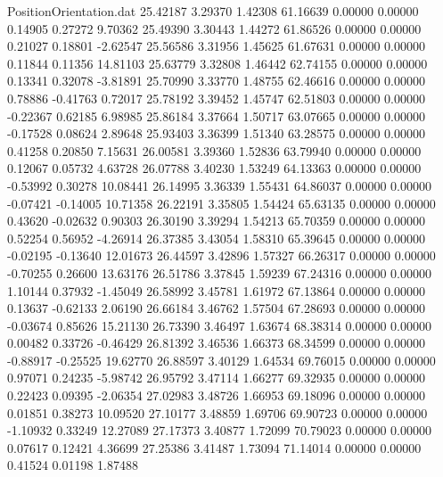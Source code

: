 \begin{filecontents}{PositionOrientation.dat}
  25.42187    3.29370    1.42308    61.16639    0.00000    0.00000    0.14905    0.27272    9.70362
  25.49390    3.30443    1.44272    61.86526    0.00000    0.00000    0.21027    0.18801   -2.62547
  25.56586    3.31956    1.45625    61.67631    0.00000    0.00000    0.11844    0.11356   14.81103
  25.63779    3.32808    1.46442    62.74155    0.00000    0.00000    0.13341    0.32078   -3.81891
  25.70990    3.33770    1.48755    62.46616    0.00000    0.00000    0.78886   -0.41763    0.72017
  25.78192    3.39452    1.45747    62.51803    0.00000    0.00000   -0.22367    0.62185    6.98985
  25.86184    3.37664    1.50717    63.07665    0.00000    0.00000   -0.17528    0.08624    2.89648
  25.93403    3.36399    1.51340    63.28575    0.00000    0.00000    0.41258    0.20850    7.15631
  26.00581    3.39360    1.52836    63.79940    0.00000    0.00000    0.12067    0.05732    4.63728
  26.07788    3.40230    1.53249    64.13363    0.00000    0.00000   -0.53992    0.30278   10.08441
  26.14995    3.36339    1.55431    64.86037    0.00000    0.00000   -0.07421   -0.14005   10.71358
  26.22191    3.35805    1.54424    65.63135    0.00000    0.00000    0.43620   -0.02632    0.90303
  26.30190    3.39294    1.54213    65.70359    0.00000    0.00000    0.52254    0.56952   -4.26914
  26.37385    3.43054    1.58310    65.39645    0.00000    0.00000   -0.02195   -0.13640   12.01673
  26.44597    3.42896    1.57327    66.26317    0.00000    0.00000   -0.70255    0.26600   13.63176
  26.51786    3.37845    1.59239    67.24316    0.00000    0.00000    1.10144    0.37932   -1.45049
  26.58992    3.45781    1.61972    67.13864    0.00000    0.00000    0.13637   -0.62133    2.06190
  26.66184    3.46762    1.57504    67.28693    0.00000    0.00000   -0.03674    0.85626   15.21130
  26.73390    3.46497    1.63674    68.38314    0.00000    0.00000    0.00482    0.33726   -0.46429
  26.81392    3.46536    1.66373    68.34599    0.00000    0.00000   -0.88917   -0.25525   19.62770
  26.88597    3.40129    1.64534    69.76015    0.00000    0.00000    0.97071    0.24235   -5.98742
  26.95792    3.47114    1.66277    69.32935    0.00000    0.00000    0.22423    0.09395   -2.06354
  27.02983    3.48726    1.66953    69.18096    0.00000    0.00000    0.01851    0.38273   10.09520
  27.10177    3.48859    1.69706    69.90723    0.00000    0.00000   -1.10932    0.33249   12.27089
  27.17373    3.40877    1.72099    70.79023    0.00000    0.00000    0.07617    0.12421    4.36699
  27.25386    3.41487    1.73094    71.14014    0.00000    0.00000    0.41524    0.01198    1.87488

\end{filecontents}
